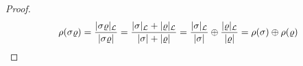 \begin{proof}
	\begin{align*}
		\rho(\sigma\varrho)
		= \dfrac{|\sigma\varrho|_{\mathcal{L}}}{|\sigma\varrho|}
		= \dfrac{|\sigma|_{\mathcal{L}} + |\varrho|_{\mathcal{L}}}{|\sigma| + |\varrho|}
		= \dfrac{|\sigma|_{\mathcal{L}}}{|\sigma|} \oplus \dfrac{|\varrho|_{\mathcal{L}}}{|\varrho|}
		= \rho(\sigma) \oplus \rho(\varrho)
	\end{align*}
\end{proof}

\begin{figure}
	\centering
\end{figure}
